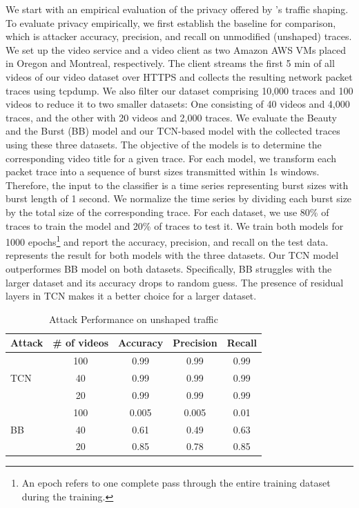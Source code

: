 We start with an empirical evaluation of the privacy offered by {\sys}'s traffic
shaping.
To evaluate privacy empirically, we first establish the baseline for comparison, which is attacker accuracy, precision, and recall on unmodified (\ie unshaped) traces.
We set up the video service and a video client as two Amazon AWS VMs placed in Oregon and Montreal, respectively.
The client streams the first 5 min of all videos of our video dataset over HTTPS and collects the resulting network packet traces using tcpdump.
We also filter our dataset comprising 10,000 traces and 100 videos to reduce it to two smaller datasets: One consisting of 40 videos and 4,000 traces, and the other with 20 videos and 2,000 traces.
We evaluate the Beauty and the Burst (BB) model and our TCN-based model with the collected traces using these three datasets.
The objective of the models is to determine the corresponding video title for a given trace. 
For each model, we transform each packet trace into a sequence of burst sizes
transmitted within 1s windows.
Therefore, the input to the classifier is a time series representing burst sizes with burst length of 1 second.
We normalize the time series by dividing each burst size by the total size of the corresponding trace.
For each dataset, we use 80\% of traces to train the model and 20\% of traces to test it. 
We train both models for 1000 epochs\footnote{An epoch refers to one complete pass through the entire training dataset during the training.} and report the accuracy, precision, and recall on the test data.
 represents the result for both models with the three datasets.
Our TCN model outperformes BB model on both datasets. 
Specifically, BB struggles with the larger dataset and its accuracy drops to random guess. 
The presence of residual layers in TCN makes it a better choice for a larger dataset.
\begin{table}[h]
  \centering
  \caption{Attack Performance on unshaped traffic}
  \begin{tabular}{|l|c|c|c|c|}
    \hline
    \textbf{Attack} & \textbf{\# of videos} & \textbf{Accuracy} & \textbf{Precision} & \textbf{Recall} \\ 
    \hline
    \multirow{3}{*}{TCN} & 100 & 0.99 & 0.99 & 0.99 \\ 
                         & 40  & 0.99 & 0.99 & 0.99 \\
                         & 20  & 0.99 & 0.99 & 0.99 \\
    \hline
    \multirow{3}{*}{BB}  & 100 & 0.005  & 0.005 & 0.01 \\ 
                         & 40  & 0.61  & 0.49 & 0.63 \\ 
                         & 20  & 0.85  & 0.78 & 0.85 \\ 
    \hline
  \end{tabular}\label{tab:attack-performance}
\end{table}

